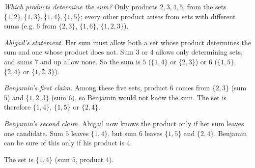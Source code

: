 \emph{Which products determine the sum?} Only products $2,3,4,5$, from the sets $\{1,2\},\{1,3\},\{1,4\},\{1,5\}$; every other product arises from sets with different sums (e.g. $6$ from $\{2,3\}$, $\{1,6\}$, $\{1,2,3\}$).

\emph{Abigail's statement.} Her sum must allow both a set whose product determines the sum and one whose product does not. Sum $3$ or $4$ allows only determining sets, and sums $7$ and up allow none. So the sum is $5$ ($\{1,4\}$ or $\{2,3\}$) or $6$ ($\{1,5\}$, $\{2,4\}$ or $\{1,2,3\}$).

\emph{Benjamin's first claim.} Among these five sets, product $6$ comes from $\{2,3\}$ (sum $5$) and $\{1,2,3\}$ (sum $6$), so Benjamin would not know the sum. The set is therefore $\{1,4\}$, $\{1,5\}$ or $\{2,4\}$.

\emph{Benjamin's second claim.} Abigail now knows the product only if her sum leaves one candidate. Sum $5$ leaves $\{1,4\}$, but sum $6$ leaves $\{1,5\}$ and $\{2,4\}$. Benjamin can be sure of this only if his product is $4$.

The set is $\boxed{\{1,4\}}$ (sum $5$, product $4$).
